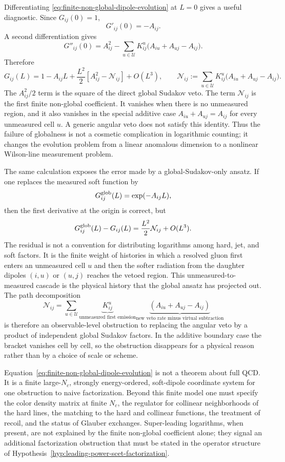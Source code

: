 Differentiating \eqref{eq:finite-non-global-dipole-evolution} at \(L=0\)
gives a useful diagnostic.  Since \(G_{ij}(0)=1\),
\[
  G'_{ij}(0)=-A_{ij}.
\]
A second differentiation gives
\[
  G''_{ij}(0)
  =
  A_{ij}^2
  -
  \sum_{u\in\mathcal U}
  K_{ij}^{u}\bigl(A_{iu}+A_{uj}-A_{ij}\bigr).
\]
Therefore
\begin{equation}
  G_{ij}(L)
  =
  1-A_{ij}L
  +
  \frac{L^2}{2}
  \left[
    A_{ij}^2-\mathcal N_{ij}
  \right]
  +O(L^3),
  \qquad
  \mathcal N_{ij}
  :=
  \sum_{u\in\mathcal U}
  K_{ij}^{u}\bigl(A_{iu}+A_{uj}-A_{ij}\bigr).
  \label{eq:finite-non-global-second-order}
\end{equation}
The \(A_{ij}^2/2\) term is the square of the direct global Sudakov veto.  The
term \(\mathcal N_{ij}\) is the first finite non-global coefficient.  It
vanishes when there is no unmeasured region, and it also vanishes in the
special additive case \(A_{iu}+A_{uj}=A_{ij}\) for every unmeasured cell
\(u\).  A generic angular veto does not satisfy this identity.  Thus the
failure of globalness is not a cosmetic complication in logarithmic counting;
it changes the evolution problem from a linear anomalous dimension to a
nonlinear Wilson-line measurement problem.

The same calculation exposes the error made by a global-Sudakov-only ansatz.
If one replaces the measured soft function by
\[
  G_{ij}^{\rm glob}(L)=\exp(-A_{ij}L),
\]
then the first derivative at the origin is correct, but
\[
  G_{ij}^{\rm glob}(L)-G_{ij}(L)
  =
  \frac{L^2}{2}\mathcal N_{ij}+O(L^3).
\]
The residual is not a convention for distributing logarithms among hard, jet,
and soft factors.  It is the finite weight of histories in which a resolved
gluon first enters an unmeasured cell \(u\) and then the softer radiation from
the daughter dipoles \((i,u)\) or \((u,j)\) reaches the vetoed region.  This
unmeasured-to-measured cascade is the physical history that the global ansatz
has projected out.  The path decomposition
\[
  \mathcal N_{ij}
  =
  \sum_{u\in\mathcal U}
  \underbrace{K_{ij}^u}_{\text{unmeasured first emission}}
  \underbrace{(A_{iu}+A_{uj}-A_{ij})}_{\text{new veto rate minus virtual subtraction}}
\]
is therefore an observable-level obstruction to replacing the angular veto by
a product of independent global Sudakov factors.  In the additive boundary
case the bracket vanishes cell by cell, so the obstruction disappears for a
physical reason rather than by a choice of scale or scheme.

Equation~\eqref{eq:finite-non-global-dipole-evolution} is not a theorem about
full QCD.  It is a finite large-\(N_c\), strongly energy-ordered,
soft-dipole coordinate system for one obstruction to naive factorization.
Beyond this finite model one must specify the color density matrix at finite
\(N_c\), the regulator for collinear neighborhoods of the hard lines, the
matching to the hard and collinear functions, the treatment of recoil, and
the status of Glauber exchanges.  Super-leading logarithms, when present, are
not explained by the finite non-global coefficient alone; they signal an
additional factorization obstruction that must be stated in the operator
structure of Hypothesis~\ref{hyp:leading-power-scet-factorization}.


